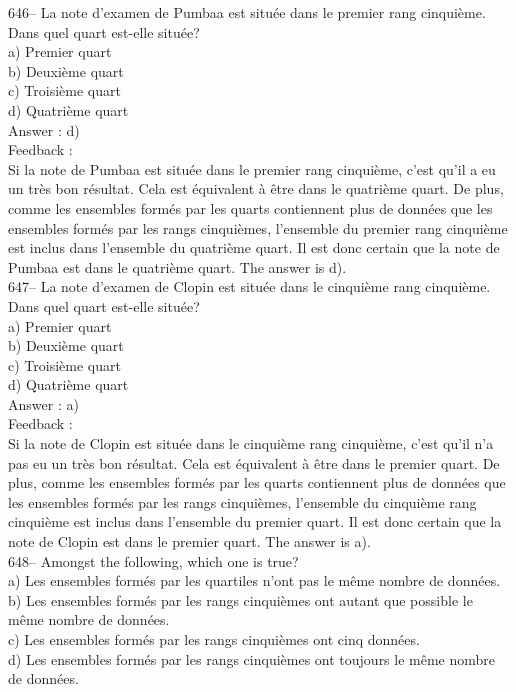 \documentclass[letterpaper, 12pt]{article}
\begin{document}
646-- La note d'examen de Pumbaa est situ\'ee dans le premier rang
cinqui\`eme.  Dans quel quart est-elle situ\'ee?\\
a) Premier quart\\
b) Deuxi\`eme quart\\
c) Troisi\`eme quart\\
d) Quatri\`eme quart\\

Answer : d)\\

Feedback : \\
Si la note de Pumbaa est situ\'ee dans le premier rang cinqui\`eme, c'est
qu'il a eu un tr\`es bon r\'esultat.  Cela est \'equivalent \`a \^etre dans
le quatri\`eme quart.  De plus, comme les ensembles form\'es par les quarts
contiennent plus de donn\'ees que les ensembles form\'es par les rangs
cinqui\`emes, l'ensemble du premier rang cinqui\`eme est inclus dans
l'ensemble du quatri\`eme quart.  Il est donc certain que la note de Pumbaa
est dans le quatri\`eme quart.  The answer is d).\\

647-- La note d'examen de Clopin est situ\'ee dans le cinqui\`eme rang
cinqui\`eme.  Dans quel quart est-elle situ\'ee?\\
a) Premier quart\\
b) Deuxi\`eme quart\\
c) Troisi\`eme quart\\
d) Quatri\`eme quart\\

Answer : a)\\

Feedback : \\
Si la note de Clopin est situ\'ee dans le cinqui\`eme rang cinqui\`eme,
c'est qu'il n'a pas eu un tr\`es bon r\'esultat.  Cela est \'equivalent \`a
\^etre dans le premier quart.  De plus, comme les ensembles form\'es par les
quarts contiennent plus de donn\'ees que les ensembles form\'es par les
rangs cinqui\`emes, l'ensemble du cinqui\`eme rang cinqui\`eme est inclus
dans l'ensemble du premier quart.  Il est donc certain que la note de Clopin
est dans le premier quart.  The answer is a).\\

648-- Amongst the following, which one is true?\\
a) Les ensembles form\'es par les quartiles n'ont pas le m\^eme nombre de
donn\'ees.\\
b) Les ensembles form\'es par les rangs cinqui\`emes ont autant que possible
le m\^eme nombre de donn\'ees.\\
c) Les ensembles form\'es par les rangs cinqui\`emes ont cinq donn\'ees.\\
d) Les ensembles form\'es par les rangs cinqui\`emes ont toujours le m\^eme
nombre de donn\'ees.\\
\end{document}
